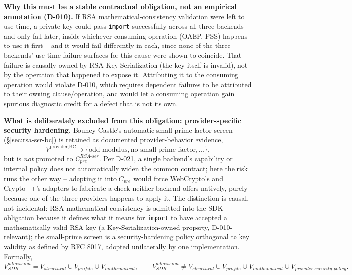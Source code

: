\documentclass[11pt,a4paper]{article}
\begin{document}
\textbf{Why this must be a stable contractual obligation, not an empirical annotation (D-010).} If RSA mathematical-consistency validation were left to use-time, a private key could pass \texttt{import} successfully across all three backends and only fail later, inside whichever consuming operation (OAEP, PSS) happens to use it first -- and it would fail differently in each, since none of the three backends' use-time failure surfaces for this cause were shown to coincide. That failure is causally owned by RSA Key Serialization (the key itself is invalid), not by the operation that happened to expose it. Attributing it to the consuming operation would violate D-010, which requires dependent failures to be attributed to their owning clause/operation, and would let a consuming operation gain spurious diagnostic credit for a defect that is not its own.

\textbf{What is deliberately excluded from this obligation: provider-specific security hardening.} Bouncy Castle's automatic small-prime-factor screen (\S\ref{sec:rsa-ser-bc}) is retained as documented provider-behavior evidence,
\[
V^{\text{provider,BC}} \supset \{\text{odd modulus}, \text{no small-prime factor}, \dots\},
\]
but is \emph{not} promoted to $C_{pre}^{RSA\text{-}ser}$. Per D-021, a single backend's capability or internal policy does not automatically widen the common contract; here the risk runs the other way -- adopting it into $C_{pre}$ would force WebCrypto's and Crypto++'s adapters to fabricate a check neither backend offers natively, purely because one of the three providers happens to apply it. The distinction is causal, not incidental: RSA mathematical consistency is admitted into the SDK obligation because it defines what it means for \texttt{import} to have accepted a mathematically valid RSA key (a Key-Serialization-owned property, D-010-relevant); the small-prime screen is a security-hardening policy orthogonal to key validity as defined by RFC 8017, adopted unilaterally by one implementation. Formally,
\[
V^{admission}_{SDK} = V_{structural} \cup V_{profile} \cup V_{mathematical}, \qquad V^{admission}_{SDK} \neq V_{structural} \cup V_{profile} \cup V_{mathematical} \cup V_{provider\text{-}security\text{-}policy}.
\]
\end{document}
